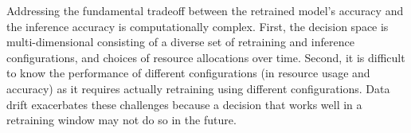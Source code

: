 Addressing the fundamental tradeoff between the retrained model's accuracy and the inference accuracy is computationally complex. %
First, the decision space is multi-dimensional consisting of a diverse set of retraining and inference configurations, and choices of resource allocations over time. %
Second, it is difficult to know the performance of different configurations (in resource usage and accuracy) as it requires actually retraining using different configurations. Data drift exacerbates these challenges because a decision that works well in a retraining window may not do so in the future.

